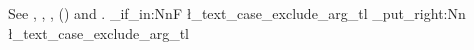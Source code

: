 See , , , () and .
\ProvideDocumentCommand{}
\ProvideDocumentCommand\flmCitePreSpace{}{\unskip~}
\ProvideDocumentCommand{}
\def\flm@cite@bookmark#1{\ifx[#1\expandafter\flm@cite@bookmark@note\fi}
\def\flm@cite@bookmark@note#1]#2{}
\AtBeginDocument{\ifdefined\pdfstringdefDisableCommands
  \pdfstringdefDisableCommands{%
    \def\flmCitePreSpace{}%
    \let\flmCite\flm@cite@bookmark
    \def\flmRefCite#1#2{}%
  }\fi}
\ExplSyntaxOn
\tl_if_in:NnF \l_text_case_exclude_arg_tl { \flmCite } { \tl_put_right:Nn \l_text_case_exclude_arg_tl { \flmCite } }
\ExplSyntaxOff
\endinput

